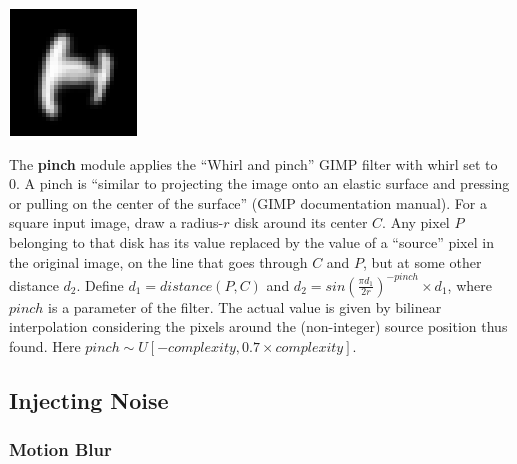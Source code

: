 \documentclass{article} %
\begin{document}
\begin{minipage}[b]{0.14\linewidth}
\begin{center}
\includegraphics[scale=.4]{images/Pinch_only.png}\\
\vspace*{15mm}
\end{center}
\end{minipage}%
\hspace{0.3cm}\begin{minipage}[b]{0.86\linewidth}
The {\bf pinch} module applies the ``Whirl and pinch'' GIMP filter with whirl set to 0. 
A pinch is ``similar to projecting the image onto an elastic
surface and pressing or pulling on the center of the surface'' (GIMP documentation manual).
For a square input image, draw a radius-$r$ disk
around its center $C$. Any pixel $P$ belonging to
that disk has its value replaced by
the value of a ``source'' pixel in the original image,
on the line that goes through $C$ and $P$, but
at some other distance $d_2$. Define $d_1=distance(P,C)$
and $d_2 = sin(\frac{\pi{}d_1}{2r})^{-pinch} \times
d_1$, where $pinch$ is a parameter of the filter.
The actual value is given by bilinear interpolation considering the pixels
around the (non-integer) source position thus found.
Here $pinch \sim U[-complexity, 0.7 \times complexity]$.
\end{minipage}


\subsection{Injecting Noise}

\subsubsection*{Motion Blur}
\end{document}
